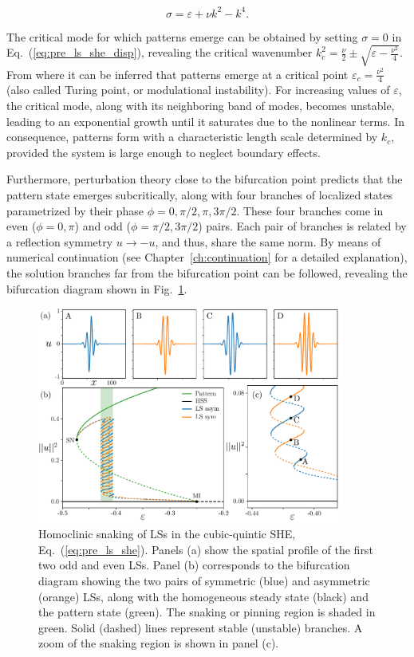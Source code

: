 \begin{equation}
    \sigma = \varepsilon + \nu k^2 - k^4.
    \label{eq:pre_ls_she_disp}
\end{equation}

The critical mode for which patterns emerge can be obtained by setting $\sigma = 0$ in Eq.~(\ref{eq:pre_ls_she_disp}),
revealing the critical wavenumber $k_c^2 = \frac{\nu}{2} \pm \sqrt{\varepsilon - \frac{\nu^2}{4}}$. From where
it can be inferred that patterns emerge at a critical point $\varepsilon_c = \frac{\nu^2}{4}$ 
(also called Turing point, or modulational instability). For increasing values of $\varepsilon$,
the critical mode, along with its neighboring band of modes, becomes unstable, leading to an exponential growth
until it saturates due to the nonlinear terms. In consequence, patterns form with a characteristic length scale determined
by $k_c$, provided the system is large enough to neglect boundary effects.

Furthermore, perturbation theory close to the bifurcation point \cite{burke2007snakes}
predicts that the pattern state emerges subcritically, along with four branches of
localized states parametrized by their phase $\phi = 0, \pi/2, \pi, 3\pi/2$. These
four branches come in even ($\phi = 0, \pi$) and odd ($\phi = \pi/2, 3\pi/2$) pairs.
Each pair of branches is related by a reflection symmetry $u \to -u$, and thus,
share the same norm. By means of numerical continuation (see Chapter~\ref{ch:continuation}
for a detailed explanation),
the solution branches far from the bifurcation point can be followed, revealing the
bifurcation diagram shown in Fig.~\ref{fig:pre_ls_she_bif}.

\begin{figure}[h]
    \centering
    \includegraphics[width=0.9\textwidth]{imagenes/framework/LS/she_full_snaking.pdf}
    \caption{Homoclinic snaking of LSs in the cubic-quintic SHE, Eq.~(\ref{eq:pre_ls_she}).
    Panels (a) show the spatial profile of the first two odd and even LSs.
    Panel (b) corresponds to the bifurcation diagram showing the two pairs of symmetric 
    (blue) and asymmetric (orange) LSs, along with the homogeneous steady 
    state (black) and the pattern state (green). The snaking or pinning region is shaded in green. 
    Solid (dashed) lines represent stable (unstable) branches. A zoom of 
    the snaking region is shown in panel (c).}
    \label{fig:pre_ls_she_bif}
\end{figure}

